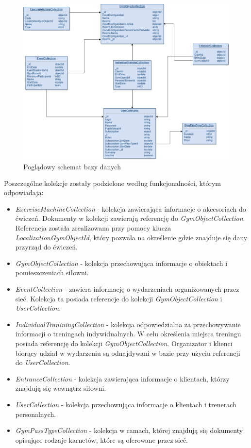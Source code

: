 \documentclass[a4paper,twoside,12pt]{book}
\begin{document}
{\begin{figure}[htbp]
	\centering
	\includegraphics[width=1\linewidth]{../diagramy/schemat_bazy}
	\caption{Poglądowy schemat bazy danych}
	\label{fig:schematbazy}
\end{figure}

Poszczególne kolekcje zostały podzielone według funkcjonalności, którym odpowiadają:
\begin{itemize}
	\item \textit{ExerciseMachineCollection} - kolekcja zawierająca informacje o akcesoriach do ćwiczeń. Dokumenty w kolekcji zawierają referencję do \textit{GymObjectCollection}. Referencja została zrealizowana przy pomocy klucza \textit{LocalizationGymObjectId}, który pozwala na określenie gdzie znajduje się dany przyrząd do ćwiczeń.
	\item \textit{GymObjectCollection} - kolekcja przechowująca informacje o obiektach i pomieszczeniach siłowni.
	\item \textit{EventCollection} - zawiera informację o wydarzeniach organizowanych przez sieć. Kolekcja ta posiada referencje do kolekcji \textit{GymObjectCollection} i \textit{UserCollection}.
	\item \textit{IndividualTraniningCollection} - kolekcja odpowiedzialna za przechowywanie informacji o treningach indywidualnych. W celu określenia miejsca treningu posiada referencję do kolekcji \textit{GymObjectCollection}. Organizator i klienci biorący udział w wydarzeniu są odnajdywani w bazie przy użyciu referencji do \textit{UserCollection}.
	\item \textit{EntranceCollection} - kolekcja zawierająca informacje o klientach, którzy znajdują się wewnątrz siłowni.
	\item \textit{UserCollection} - kolekcja przechowująca informacje o klientach i trenerach personalnych.
	\item \textit{GymPassTypeCollection} - kolekcja w ramach, której znajdują się dokumenty opisujące rodzaje karnetów, które są oferowane przez sieć.
\end{itemize}

}
\end{document}
